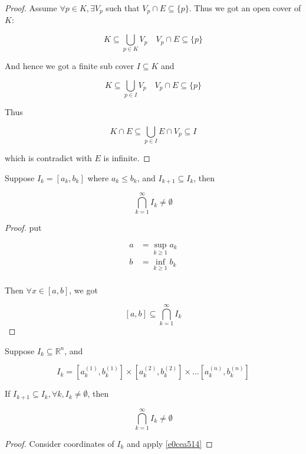 \begin{proof}
    Assume $\forall p \in K, \exists V_p$ such that $V_p \cap E \subseteq \{ p \}$. Thus we got
    an open cover of $K$:

    \[
        K \subseteq \bigcup_{p \in K} V_p \quad V_p \cap E \subseteq \{p\}
    \]

    And hence we got a finite sub cover $I \subseteq K$ and 


    \[
        K \subseteq \bigcup_{p \in I} V_p \quad V_p \cap E \subseteq \{p\}
    \]

    Thus

    \[
        K \cap E \subseteq \bigcup_{p \in I} E \cap V_p \subseteq I
    \]

    which is contradict with $E$ is infinite.
\end{proof}


\begin{thm}\label{e0cea514}
    Suppose $I_k = [a_k, b_k]$ where $a_k \le b_k$, and $I_{k+1} \subseteq I_k$, then

    \[
        \bigcap_{k=1}^{\infty} I_k \ne \emptyset
    \]
\end{thm}

\begin{proof}
    put 
    
    \begin{align*}
        a &= \sup_{k \ge 1} a_k \\
        b &= \inf_{k \ge 1} b_k \\
    \end{align*}

    Then $\forall x \in [a,b]$, we got 

    \[
        [a,b] \subseteq \bigcap_{k=1}^{\infty}I_k
    \]
\end{proof}

\begin{corollary}
    Suppose $I_k \subseteq \mathbb{R}^n$, and

    \[
        I_k = [a^{(1)}_k, b^{(1)}_k] \times [a^{(2)}_k, b^{(2)}_k] \times \dots [a^{(n)}_k, b^{(n)}_k]
    \]

    If $I_{k+1} \subseteq I_{k}, \forall k, I_k \ne \emptyset$, then 

    \[
        \bigcap_{k=1}^{\infty} I_k \ne \emptyset
    \]
\end{corollary}

\begin{proof}
    Consider coordinates of $I_k$ and apply \cref{e0cea514}
\end{proof}

